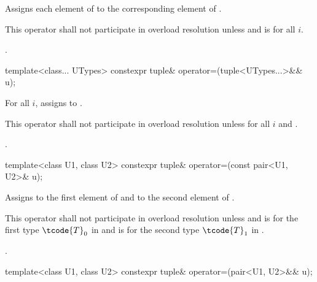 \begin{itemdescr}
\pnum
\effects
Assigns each element of  to the corresponding element
of .

\pnum
\remarks
This operator shall not participate in overload resolution unless
 and
 is  for all $i$.

\pnum
\returns
{}.
\end{itemdescr}

%
\begin{itemdecl}
template<class... UTypes> constexpr tuple& operator=(tuple<UTypes...>&& u);
\end{itemdecl}

\begin{itemdescr}
\pnum
\effects
For all $i$, assigns  to
.

\pnum
\remarks
This operator shall not participate in overload resolution unless
 for all $i$ and
.

\pnum
\returns
{}.
\end{itemdescr}

%
%
\begin{itemdecl}
template<class U1, class U2> constexpr tuple& operator=(const pair<U1, U2>& u);
\end{itemdecl}

\begin{itemdescr}
\pnum
\effects
Assigns  to the first element of 
and  to the second element of .

\pnum
\remarks
This operator shall not participate in overload resolution unless
 and
 is  for the first type $\tcode{T}_0$ in
 and  is  for the
second type $\tcode{T}_1$ in .

\pnum
\returns
{}.
\end{itemdescr}

%
%
\begin{itemdecl}
template<class U1, class U2> constexpr tuple& operator=(pair<U1, U2>&& u);
\end{itemdecl}

